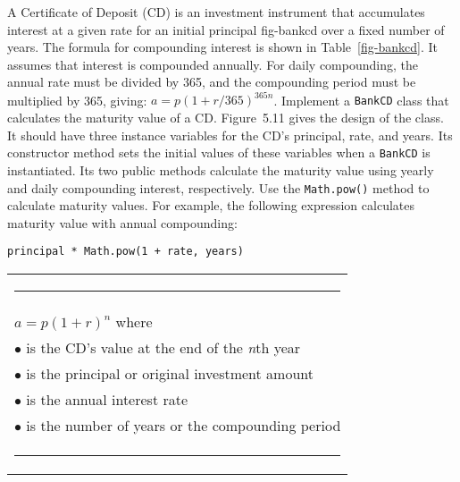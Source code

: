 \begin{SSTUDY}

\item A Certificate of Deposit (CD) is an investment instrument
that accumulates interest at a given rate for an initial principal
{fig-bankcd}
over a fixed number of years.  The formula for compounding interest is
shown in Table~\ref{fig-bankcd}. It assumes that interest is compounded
annually. For daily compounding, the annual rate must be divided by
365, and the compounding period must be multiplied by 365, giving: $a
= p(1 + r/365)^{365n}$.  Implement a {\tt BankCD} class that
calculates the maturity value of a CD. Figure~5.11 gives the design
of the class. It should have three instance variables for the CD's
principal, rate, and years. Its constructor method sets the initial
values of these variables when a {\tt BankCD} is instantiated. Its two
public methods calculate the maturity value using yearly and daily
compounding interest, respectively.  Use the {\tt Math.pow()} method
to calculate maturity values. For example, the following expression
calculates maturity value with annual compounding:

\begin{jjjlisting}
\begin{lstlisting}
principal * Math.pow(1 + rate, years)
\end{lstlisting}
\end{jjjlisting}

\begin{table}[htb]
\hspace*{3pc}\begin{tabular}{l}
\multicolumn{1}{l}{\color{cyan}\rule{20pc}{1pt}}\\[2pt]
           \multicolumn{1}{l}{$a = p(1 + r)^n$ where}\\[6pt]
$\bullet$\hspace*{5pt}{\it a} is the CD's value at the end of the {\it n}th year\\
$\bullet$\hspace*{5pt}{\it p} is the principal or original investment amount\\
$\bullet$\hspace*{5pt}{\it r} is the annual interest rate\\
$\bullet$\hspace*{5pt}{\it n} is the number of years or the compounding period
\\[-4pt]\multicolumn{1}{l}{\color{cyan}\rule{20pc}{1pt}}
\end{tabular}
\endTB
\end{table}


\end{SSTUDY}
